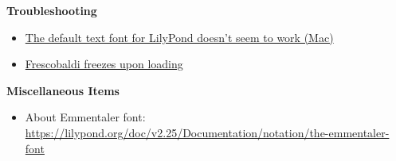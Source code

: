 \textbf{Troubleshooting}
\begin{itemize}
\item \href{https://github.com/Homebrew/homebrew-core/pull/118260#issuecomment-1368249969}{The default text font for LilyPond doesn’t seem to work (Mac)}
\item \href{https://github.com/frescobaldi/frescobaldi/issues/1793}{Frescobaldi freezes upon loading}
\end{itemize}

\textbf{Miscellaneous Items}
\begin{itemize}
\item About Emmentaler font: \url{https://lilypond.org/doc/v2.25/Documentation/notation/the-emmentaler-font}
\end{itemize}


